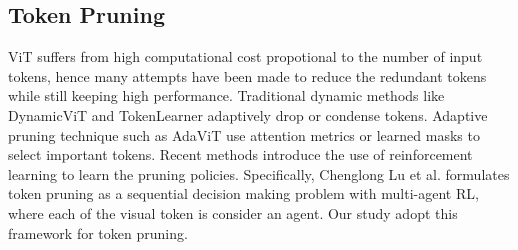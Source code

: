 \subsection{Token Pruning}
ViT suffers from high computational cost propotional to the number of input tokens, hence many attempts have been made to reduce the redundant tokens while still keeping high performance. Traditional dynamic methods like DynamicViT \cite{rao2021dynamicvit} and TokenLearner \cite{ryoo2021tokenlearner} adaptively drop or condense tokens. Adaptive pruning technique such as AdaViT \cite{meng2022adavit} use attention metrics or learned masks to select important tokens. Recent methods introduce the use of reinforcement learning to learn the pruning policies. Specifically, Chenglong Lu et al. \cite{lu2025reinforcement} formulates token pruning as a sequential decision making problem with multi-agent RL, where each of the visual token is consider an agent. Our study adopt this framework for token pruning.
